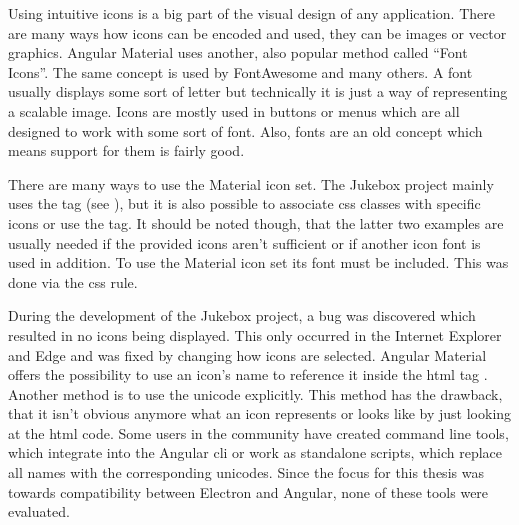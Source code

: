 
Using intuitive icons is a big part of the visual design of any application. There are many ways how icons can be encoded and used, \zB they can be images or vector graphics. Angular Material uses another, also popular method called \enquote{Font Icons}. The same concept is used by FontAwesome \cite{fontAwesome} and many others. A font usually displays some sort of letter but technically it is just a way of representing a scalable image. Icons are mostly used in buttons or menus which are all designed to work with some sort of font. Also, fonts are an old concept which means support for them is fairly good.

There are many ways to use the Material icon set. The Jukebox project mainly uses the  tag (see ), but it is also possible to associate \gls{css} classes with specific icons or use the  tag. It should be noted though, that the latter two examples are usually needed if the provided icons aren't sufficient or if \zB another icon font is used in addition. To use the Material icon set its font must be included. This was done via the  \gls{css} rule.

During the development of the Jukebox project, a bug was discovered which resulted in no icons being displayed. This only occurred in the Internet Explorer and Edge and was fixed by changing how icons are selected. Angular Material offers the possibility to use an icon's name to reference it inside the \gls{html} tag \zB {}. Another method is to use the unicode explicitly. This method has the drawback, that it isn't obvious anymore what an icon represents or looks like by just looking at the \gls{html} code. Some users in the community have created command line tools, which integrate into the Angular \gls{cli} or work as standalone scripts, which replace all names with the corresponding unicodes. Since the focus for this thesis was towards compatibility between Electron and Angular, none of these tools were evaluated. \cite{materialIcons}
